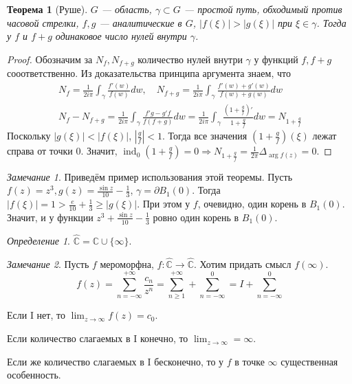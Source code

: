 \documentclass[12pt]{article}
\renewcommand{\C}{\mathbb{C}}
\newcommand{\ind}{\mathbbm{1}}
\renewcommand{\ind}{\operatorname{ind}}
\newcommand{\union}{\cup}
\newcommand{\Ra}{\Rightarrow}
\newcounter{cnt}
\theoremstyle{thmnote}
\newtheorem{theorem}[cnt]{Теорема}
\theoremstyle{remark}
\newtheorem*{remark}{Замечание}
\theoremstyle{defnote}
\newtheorem{definition}[cnt]{Определение}
\begin{document}
\begin{theorem}[Руше]
\label{rouche}
    $G$ --- область, $\gamma \subset G$ --- простой путь, обходимый против часовой стрелки, $f, g$ --- аналитические в $G$, $|f(\xi)| > |g(\xi)|$ при $\xi \in \gamma$. Тогда у $f$ и $f + g$ одинаковое число нулей внутри $\gamma$.
\end{theorem}
\begin{proof}
    Обозначим за $N_f, N_{f + g}$ количество нулей внутри $\gamma$ у функций $f, f + g$ сооответственно. Из доказательства принципа аргумента знаем, что
    \begin{gather*}
        N_f = \frac{1}{2 i \pi} \int_\gamma \frac{f'(w)}{f(w)} dw, \quad N_{f + g} = \frac{1}{2 i \pi} \int_\gamma \frac{f'(w) + g'(w)}{f(w) + g(w)} dw \\
        N_f - N_{f + g} = \frac{1}{2 i \pi} \int_\gamma \frac{f'g - g'f}{f (f + g)} dw = \frac{1}{2 i \pi} \int_\gamma \frac{\left(1 + \frac{g}{f}\right)'}{1 + \frac{g}{f}} dw = N_{1 + \frac{g}{f}}
    \end{gather*}
    Поскольку $|g(\xi)| < |f(\xi)|$, $\left|\frac{g}{f}\right| < 1$. Тогда все значения $\left(1 + \frac{g}{f}\right)(\xi)$ лежат справа от точки 0. Значит, $\ind_0 \left(1 + \frac{g}{f}\right) = 0 \Ra N_{1 + \frac{g}{f}} = \frac{1}{2 \pi} \Delta_{\arg f(z)} = 0$. 
\end{proof}

\begin{remark}
    Приведём пример использования этой теоремы. Пусть $f(z) = z^3, g(z) = \frac{\sin z}{10} - \frac{1}{3}$, $\gamma = \partial B_1(0)$. Тогда $|f(\xi)| = 1 > \frac{e}{10} + \frac{1}{3} \geq |g(\xi)|$. При этом у $f$, очевидно, один корень в $B_1(0)$. Значит, и у функции $z^3 + \frac{\sin z}{10} - \frac{1}{3}$ ровно один корень в $B_1(0)$.
\end{remark}

\begin{definition}
    $\hat{\C} = \C \union \{\infty\}$.
\end{definition}

\begin{remark}
    Пусть $f$ мероморфна, $f: \hat{\C} \to \hat{\C}$. Хотим придать смысл $f(\infty)$.
    \begin{equation*}
        f(z) = \sum_{n = -\infty}^{+\infty} \frac{c_n}{z^n} = \sum_{n \geq 1}^{+\infty} + \sum_{n = -\infty}^{0} = I + \sum_{n = -\infty}^{0}
    \end{equation*}
    
    Если I нет, то $\lim_{z \to \infty} f(z) = c_0$.

    Если количество слагаемых в I конечно, то $\lim_{z \to \infty} = \infty$.

    Если же количество слагаемых в I бесконечно, то у $f$ в точке $\infty$ существенная особенность.
\end{remark}
\end{document}
